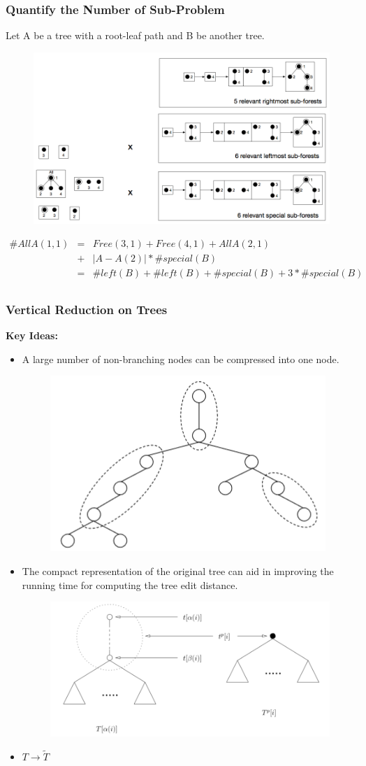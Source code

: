 \documentclass{beamer}
\begin{document}
\begin{frame}
\frametitle{Quantify the Number of Sub-Problem}
Let A be a tree with a root-leaf path and B be another tree.
\begin{figure}
	\includegraphics[width=0.7\linewidth]{allleft}
	\centering
\end{figure}
\begin{eqnarray*}
\#AllA(1, 1) &=& Free(3, 1) + Free(4, 1) + AllA(2, 1)\\
&+& \left\vert A - A(2) \right\vert * \#special(B)\\
&=& \#left(B) + \#left(B) + \#special(B) + 3 * \#special(B)\\
\end{eqnarray*}
\end{frame}
\begin{frame}
\frametitle{Vertical Reduction on Trees}
\textbf{Key Ideas:}

\begin{itemize}
\item A large number of non-branching nodes can be compressed into one node.
\begin{figure}
	\includegraphics[width=0.25\linewidth]{VComponent}
	\centering
\end{figure}
\item The compact representation of the original tree can aid in improving the running time for computing the tree edit distance.
\begin{figure}
	\includegraphics[width=0.45\linewidth]{VReduction}
	\centering
\end{figure}
\item $T \to \widetilde{T}$
\end{itemize}
\end{frame}
\end{document}
